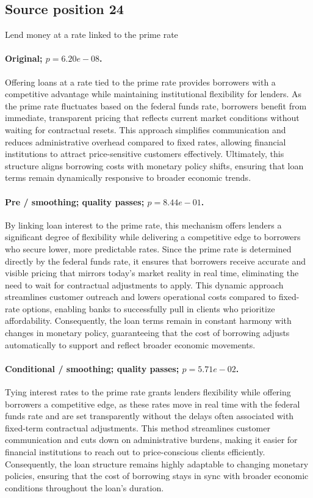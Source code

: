 \subsection*{Source position 24}
Lend money at a rate linked to the prime rate

\paragraph{Original; $p=6.20e-08$.} Offering loans at a rate tied to the prime rate provides borrowers with a competitive advantage while maintaining institutional flexibility for lenders. As the prime rate fluctuates based on the federal funds rate, borrowers benefit from immediate, transparent pricing that reflects current market conditions without waiting for contractual resets. This approach simplifies communication and reduces administrative overhead compared to fixed rates, allowing financial institutions to attract price-sensitive customers effectively. Ultimately, this structure aligns borrowing costs with monetary policy shifts, ensuring that loan terms remain dynamically responsive to broader economic trends.


\paragraph{Pre / smoothing; quality passes; $p=8.44e-01$.} By linking loan interest to the prime rate, this mechanism offers lenders a significant degree of flexibility while delivering a competitive edge to borrowers who secure lower, more predictable rates. Since the prime rate is determined directly by the federal funds rate, it ensures that borrowers receive accurate and visible pricing that mirrors today's market reality in real time, eliminating the need to wait for contractual adjustments to apply. This dynamic approach streamlines customer outreach and lowers operational costs compared to fixed-rate options, enabling banks to successfully pull in clients who prioritize affordability. Consequently, the loan terms remain in constant harmony with changes in monetary policy, guaranteeing that the cost of borrowing adjusts automatically to support and reflect broader economic movements.

\paragraph{Conditional / smoothing; quality passes; $p=5.71e-02$.} Tying interest rates to the prime rate grants lenders flexibility while offering borrowers a competitive edge, as these rates move in real time with the federal funds rate and are set transparently without the delays often associated with fixed-term contractual adjustments. This method streamlines customer communication and cuts down on administrative burdens, making it easier for financial institutions to reach out to price-conscious clients efficiently. Consequently, the loan structure remains highly adaptable to changing monetary policies, ensuring that the cost of borrowing stays in sync with broader economic conditions throughout the loan's duration.
